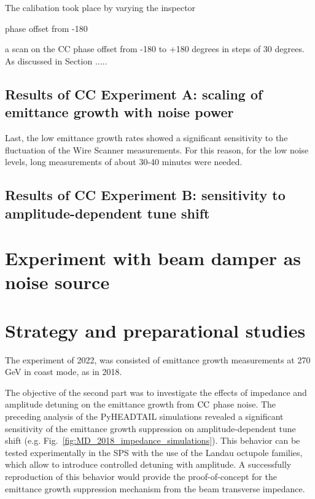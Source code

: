 The calibation took place by varying the inspector


phase offset from -180 


a scan on the CC phase offset from -180 to +180 degrees in steps of 30 degrees. As discussed in Section ..... 


\subsection{Results of CC Experiment A: scaling of emittance growth with noise power}




Last, the low emittance growth rates showed a significant sensitivity to the fluctuation of the Wire Scanner measurements. For this reason, for the low noise levels, long measurements of about 30-40 minutes were needed.
\subsection{Results of CC Experiment B: sensitivity to amplitude-dependent tune shift} 

\section{Experiment with beam damper as noise source}



\newpage

\section{Strategy and preparational studies}\label{sec:strategy_md_2022}
The experiment of 2022, was consisted of emittance growth measurements at 270\,GeV in coast mode, as in 2018. 

The objective of the second part was to investigate the effects of impedance and amplitude detuning on the emittance growth from ${\mathrm{CC}}$ phase noise. The preceding analysis of the PyHEADTAIL simulations revealed a significant sensitivity of the emittance growth suppression on amplitude-dependent tune shift (e.g. Fig.~\ref{fig:MD_2018_impedance_simulations}). This behavior can be tested experimentally in the SPS with the use of the Landau octupole families, which allow to introduce controlled detuning with amplitude. A successfully reproduction of this behavior would provide the proof-of-concept for the emittance growth suppression mechanism from the beam transverse impedance.




